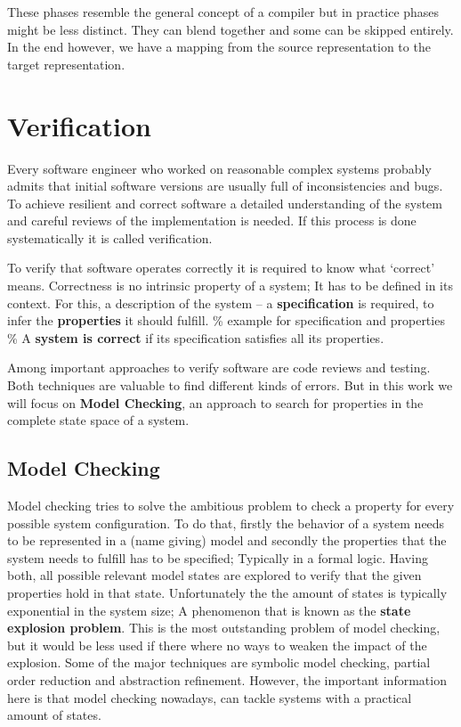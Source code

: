 These phases resemble the general concept of a compiler but in practice phases might be less distinct.
They can blend together and some can be skipped entirely.
In the end however, we have a mapping from the source representation to the target representation.

\section{Verification}
\label{rel_mc}
Every software engineer who worked on reasonable complex systems probably admits that initial software versions are usually full of inconsistencies and bugs.
To achieve resilient and correct software a detailed understanding of the system and careful reviews of the implementation is needed.
If this process is done systematically it is called verification.

To verify that software operates correctly it is required to know what `correct' means.
Correctness is no intrinsic property of a system;
It has to be defined in its context.
For this, a description of the system -- a \textbf{specification} is required, to infer the \textbf{properties} it should fulfill.
\% example for specification and properties \%
A \textbf{system is correct} if its specification satisfies all its properties\cite[Chapter 1]{baier2008principles}.

Among important approaches to verify software are code reviews and testing.
Both techniques are valuable to find different kinds of errors.
But in this work we will focus on \textbf{Model Checking}, an approach to search for properties in the complete state space of a system.

\subsection{Model Checking}
Model checking tries to solve the ambitious problem to check a property for every possible system configuration.
To do that, firstly the behavior of a system needs to be represented in a (name giving) model
and secondly the properties that the system needs to fulfill has to be specified;
Typically in a formal logic.
Having both, all possible relevant model states are explored to verify that the given properties hold in that state.
Unfortunately the the amount of states is typically exponential in the system size;
A phenomenon that is known as the \textbf{state explosion problem}\cite[Introduction]{mcmillan1993symbolic}.
This is the most outstanding problem of model checking, but it would be less used if there where no ways to weaken the impact of the explosion.
Some of the major techniques are symbolic model checking, partial order reduction and abstraction refinement\cite[Chapter 5]{clarke2011model}.
However, the important information here is that model checking nowadays, can tackle systems with a practical amount of states.

